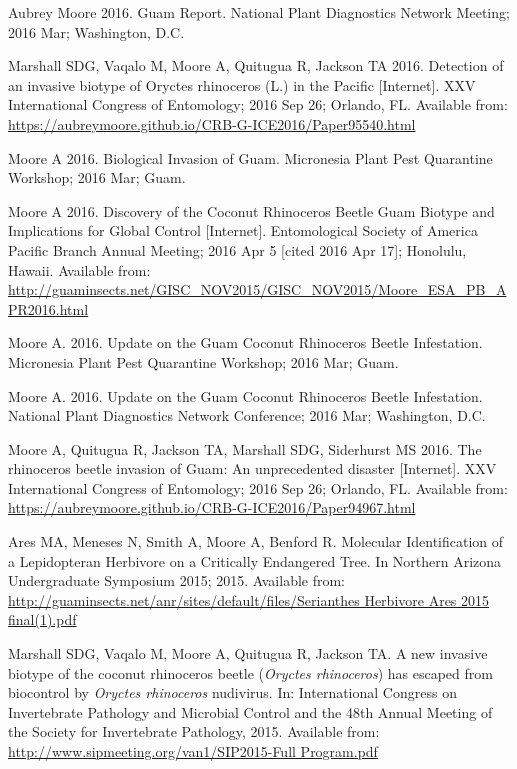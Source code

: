 \documentclass[12pt,english]{simplecv}
\begin{document}
\begin{thebibliography}{999}
\bibitem{}Aubrey Moore 2016. Guam Report. National Plant Diagnostics Network Meeting; 2016 Mar; Washington, D.C.

\bibitem{}Marshall SDG, Vaqalo M, Moore A, Quitugua R, Jackson TA 2016. Detection of an invasive biotype of Oryctes rhinoceros (L.) in the Pacific [Internet]. XXV International Congress of Entomology; 2016 Sep 26; Orlando, FL. Available from: \url{https://aubreymoore.github.io/CRB-G-ICE2016/Paper95540.html}

\bibitem{}Moore A 2016. Biological Invasion of Guam. Micronesia Plant Pest Quarantine Workshop; 2016 Mar; Guam. 

\bibitem{}Moore A 2016. Discovery of the Coconut Rhinoceros Beetle Guam Biotype and Implications for Global Control [Internet]. Entomological Society of America Pacific Branch Annual Meeting; 2016 Apr 5 [cited 2016 Apr 17]; Honolulu, Hawaii. Available from: \url{http://guaminsects.net/GISC\_NOV2015/GISC\_NOV2015/Moore\_ESA\_PB\_APR2016.html}

\bibitem{}Moore A. 2016. Update on the Guam Coconut Rhinoceros Beetle Infestation. Micronesia Plant Pest Quarantine Workshop; 2016 Mar; Guam. 

\bibitem{}Moore A. 2016. Update on the Guam Coconut Rhinoceros Beetle Infestation. National Plant Diagnostics Network Conference; 2016 Mar; Washington, D.C. 

\bibitem{}Moore A, Quitugua R, Jackson TA, Marshall SDG, Siderhurst MS 2016. The rhinoceros beetle invasion of Guam: An unprecedented disaster [Internet]. XXV International Congress of Entomology; 2016 Sep 26; Orlando, FL. Available from: \url{https://aubreymoore.github.io/CRB-G-ICE2016/Paper94967.html}

\bibitem{}Ares MA, Meneses N, Smith A, Moore A, Benford R. Molecular Identification of a Lepidopteran Herbivore on a Critically Endangered Tree. In Northern Arizona Undergraduate Symposium 2015; 2015. Available from: \url{http://guaminsects.net/anr/sites/default/files/Serianthes Herbivore Ares 2015 final(1).pdf}

\bibitem{}Marshall SDG, Vaqalo M, Moore A, Quitugua R, Jackson TA. A new invasive biotype of the coconut rhinoceros beetle (\emph{Oryctes rhinoceros}) has escaped from biocontrol by \emph{Oryctes rhinoceros} nudivirus. In: International Congress on Invertebrate Pathology and Microbial Control and the 48th Annual Meeting of the Society for Invertebrate Pathology, 2015. Available from: \url{http://www.sipmeeting.org/van1/SIP2015-Full Program.pdf}


\end{thebibliography}
\end{document}
